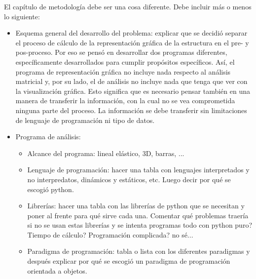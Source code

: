 {\color{red} 
El capítulo de metodología debe ser una cosa diferente. Debe incluir más o menos lo siguiente: 

\begin{itemize}
  \item Esquema general del desarrollo del problema: explicar que se decidió separar el proceso de cálculo de la representación gráfica de la estructura en el pre- y pos-proceso. Por eso se pensó en desarrollar dos programas diferentes, específicamente desarrollados para cumplir propósitos específicos. Así, el programa de representación gráfica no incluye nada respecto al análisis matricial y, por su lado, el de análisis no incluye nada que tenga que ver con la visualización gráfica. Esto significa que es necesario pensar también en una manera de transferir la información, con la cual no se vea comprometida ninguna parte del proceso. La información se debe transferir sin limitaciones de lenguaje de programación ni tipo de datos.

  \item Programa de análisis: 
    \begin{itemize} 
      \item Alcance del programa: lineal elástico, 3D, barras, ... 
      \item Lenguaje de programación: hacer una tabla con lenguajes interpretados y no interpredatos, dinámicos y estáticos, etc. Luego decir por qué se escogió python.
      \item Librerías: hacer una tabla con las librerías de python que se necesitan y poner al frente para qué sirve cada una. Comentar qué problemas traería si no se usan estas librerías y se intenta programas todo con python puro? Tiempo de cálculo? Programación complicada? no sé... 
      \item Paradigma de programación: tabla o lista con los diferentes paradigmas y después explicar por qué se escogió un paradigma de programación orientada a objetos.
    \end{itemize}


\end{itemize}}
